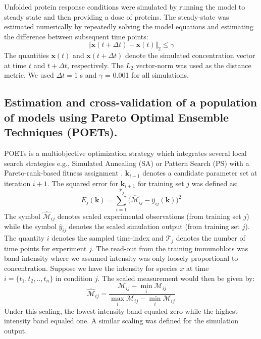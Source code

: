 \documentclass[fleqn,10pt]{wlscirep}
\begin{document}
Unfolded protein response conditions were simulated by running the model to steady state and then providing a dose of proteins. 
The steady-state was estimated numerically by repeatedly solving the model equations and estimating the difference between subsequent time points:
\begin{equation}
\Vert\mathbf{x}\left(t+\Delta{t}\right) - \mathbf{x}\left(t\right)\Vert_{2}\leq\gamma
\end{equation}
The quantities $\mathbf{x}\left(t\right)$ and $\mathbf{x}\left(t+\Delta{t}\right)$ denote the simulated concentration vector at time $t$ and $t + \Delta{t}$, respectively.
The $L_{2}$ vector-norm was used as the distance metric. 
We used $\Delta{t} = 1$ s and $\gamma$ = 0.001 for all simulations.

\subsection*{Estimation and cross-validation of a population of models using Pareto Optimal Ensemble Techniques (POETs).}
POETs is a multiobjective optimization strategy which integrates several local search strategies e.g., Simulated Annealing (SA) or Pattern Search (PS) 
with a Pareto-rank-based fitness assignment \cite{Song:2010ij}.
$\mathbf{k}_{i+1}$ denotes a candidate parameter set at iteration $i+1$. 
The squared error for $\mathbf{k}_{i+1}$ for training set $j$ was defined as:
\begin{equation}\label{eqn_cost2}
	E_{j}(\mathbf{k}) = \sum_{i=1}^{\mathcal{T}_{j}}\biggl(\hat{\mathcal{M}}_{ij}-\hat{y}_{ij}(\mathbf{k})\biggr)^2
\end{equation}
The symbol $\hat{\mathcal{M}}_{ij}$ denotes scaled experimental observations (from training set $j$) while the symbol $\hat{y}_{ij}$ denotes the scaled simulation output (from training set $j$). 
The quantity $i$ denotes the sampled time-index and $\mathcal{T}_{j}$ denotes the number of time points for experiment $j$. 
The read-out from the training immunoblots was band intensity where we assumed intensity was only loosely proportional to concentration.
Suppose we have the intensity for species $x$ at time $i=\{t_{1},t_{2},..,t_{n}\}$ in condition $j$. The scaled measurement would then be given by:
\begin{equation}\label{norm_exp_data}
\hat{\mathcal{M}}_{ij} = \frac{\mathcal{M}_{ij} - \min_{i}\mathcal{M}_{ij}}{\max_{i}{\mathcal{M}_{ij}}-\min_{i}{\mathcal{M}_{ij}}}
\end{equation}
Under this scaling, the lowest intensity band equaled zero while the highest intensity band equaled one. 
A similar scaling was defined for the simulation output. 
\end{document}
